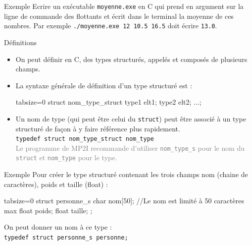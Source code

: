 \documentclass[10pt]{beamer}
\begin{document}
\begin{frame}[fragile]{\Ctitle}{\stitle}
	\begin{exampleblock}{Exemple}
		Ecrire un exécutable {\tt moyenne.exe} en C qui prend en argument sur la ligne de commande des flottants et écrit dans le terminal la moyenne de ces nombres.
		Par exemple {\tt ./moyenne.exe 12 10.5 16.5} doit écrire  {\tt 13.0}.
		\onslide<2->{
			\inputpartC{\SPATH/moyenne.c}{}{\small}{1}{12}
		}
	\end{exampleblock}
\end{frame}

\begin{frame}[fragile]{\Ctitle}{\stitle}
	\begin{block}{Définitions}
		\begin{itemize}
			\item<1-> On peut définir en C, des types structurés, appelés  et composés de plusieurs champs.
			\item<2-> La syntaxe générale de définition d'un type structuré est :
				\begin{langageC*}{tabsize=0}
					struct nom_type_struct {
					    type1 elt1;
					    type2 elt2;
					    ...};
				\end{langageC*}
			\item<3-> Un nom de type (qui peut être celui du {\tt struct}) peut être associé à un type structuré de façon à y faire référence plus rapidement.\\
				\texttt{typedef struct nom_type_struct nom_type}\\
				\textcolor{gray}{Le programme de MP2I recommande d'utiliser {\tt nom\_type\_s} pour le nom du {\tt struct} et {\tt nom\_type} pour le type.}
		\end{itemize}
	\end{block}
\end{frame}

\begin{frame}[fragile]{\Ctitle}{\stitle}
	\begin{exampleblock}{Exemple}
		Pour créer le type structuré  contenant les trois champs nom (chaine de caractères), poids et taille (float) :
		\begin{langageC*}{tabsize=0}
			struct personne_s {
			    char nom[50]; //Le nom est limité à 50 caractères max
			    float poids;
			    float taille;
			};
		\end{langageC*}
		On peut donner un nom à ce type : \\
		\texttt{typedef struct personne_s personne;}
	\end{exampleblock}
\end{frame}
\end{document}
